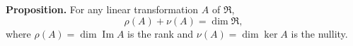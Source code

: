 \textbf{Proposition.} For any linear transformation $A$ of $\mathfrak{R}$,
$$\rho(A) + \nu(A) = \dim \mathfrak{R},$$
where $\rho(A) = \dim \operatorname{Im} A$ is the rank and $\nu(A) = \dim \ker A$ is the nullity.
